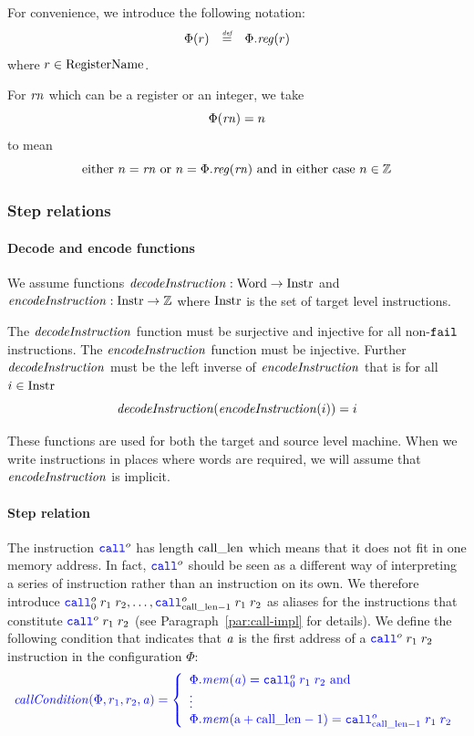 \documentclass[a4paper]{article}
\begin{document}
For convenience, we introduce the following notation:
\[
  \begin{array}{rcl}
    \Phi(r) & \stackrel{\textit{\tiny{def}}}{=} & \Phi.\mathit{reg}(r)
  \end{array}
\]
where $r\in \mathrm{RegisterName}$.

For $\mathit{rn}$ which can be a register or an integer, we take
\[
  \Phi(\mathit{rn}) = n
\]
to mean
\[
  \text{either $n = \mathit{rn}$ or $n = \Phi.\mathit{reg}(\mathit{rn})$ and in either case $n \in \mathbb{Z}$}
\]


\subsubsection{Step relations}
\paragraph{Decode and encode functions}
We assume functions $\decInstr{} : \Word \fun \Instr$ and $\encInstr{} : \Instr \fun \ints$ where $\mathrm{Instr}$ is the set of target level instructions.

The $\decInstr{}$ function must be surjective and injective for all non-$\texttt{{\color{black} fail}}$ instructions. The $\encInstr{}$ function must be injective. Further $\decInstr{}$ must be the left inverse of $\encInstr{}$ that is for all $i \in \mathrm{Instr}$
\[
  \decInstr{}(\encInstr{i}) = i
\]

These functions are used for both the target and source level machine. When we write instructions in places where words are required, we will assume that $\encInstr{}$ is implicit.

\paragraph{Step relation}
The instruction $\scall{o}{}{}$ has length $\mathrm{call\_len}$ which means that it does not fit in one memory address. In fact, $\scall{o}{}{}$ should be seen as a different way of interpreting a series of instruction rather than an instruction on its own. We therefore introduce $\scall[0]{o}{r_1}{r_2},\dots,\scall[\calllen-1]{o}{r_1}{r_2}$ as aliases for the instructions that constitute $\scall{o}{r_1}{r_2}$ (see Paragraph~\ref{par:call-impl} for details). We define the following condition that indicates that $\mathit{a}$ is the first address of a $\scall{o}{r_1}{r_2}$ instruction in the configuration $\Phi$:
\[
  \sourcecolor\left.
    \callCond{\Phi,r_1,r_2,\aaddr} = \left\{
      \begin{array}{l}
        \Phi.\mem(\aaddr) = \scall[0]{o}{r_1}{r_2} \tand\\
        \vdots \\
        \Phi.\mem(\addr+\calllen-1) = \scall[\calllen-1]{o}{r_1}{r_2}
      \end{array}
      \right.
  \right.
\]
\end{document}
